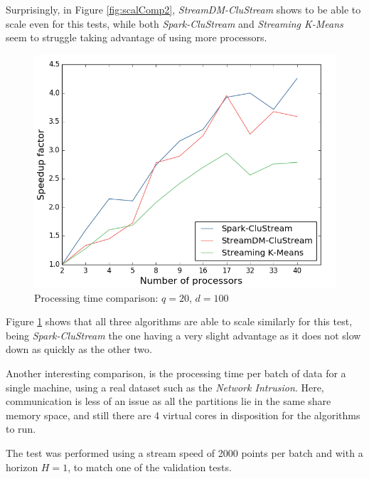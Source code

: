 Surprisingly, in Figure \ref{fig:scalComp2}, \textit{StreamDM-CluStream} shows to be able to scale even for this tests, while both \textit{Spark-CluStream} and \textit{Streaming K-Means} seem to struggle taking advantage of using more processors.

\begin{figure}[h!]
 \centering
 \includegraphics[scale=0.45]{./styles/scalComp100.png}
 \caption{Processing time comparison: $q=20$, $d=100$}
 \label{fig:scalComp100}
\end{figure}

Figure \ref{fig:scalComp100} shows that all three algorithms are able to scale similarly for this test, being \textit{Spark-CluStream} the one having a very slight advantage as it does not slow down as quickly as the other two.



Another interesting comparison, is the processing time per batch of data for a single machine, using a real dataset such as the \textit{Network Intrusion}. Here, communication is less of an issue as all the partitions lie in the same share memory space, and still there are 4 virtual cores in disposition for the algorithms to run. 

The test was performed using a stream speed of 2000 points per batch and with a horizon $H=1$, to match one of the validation tests.


